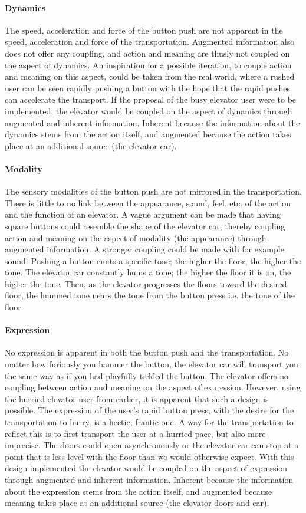\paragraph{Dynamics} The speed, acceleration and force of the button push are not apparent in the speed, acceleration and force of the transportation. Augmented information also does not offer any coupling, and action and meaning are thusly not coupled on the aspect of dynamics. An inspiration for a possible iteration, to couple action and meaning on this aspect, could be taken from the real world, where a rushed user can be seen rapidly pushing a button with the hope that the rapid pushes can accelerate the transport. If the proposal of the busy elevator user were to be implemented, the elevator would be coupled on the aspect of dynamics through augmented and inherent information. Inherent because the information about the dynamics stems from the action itself, and augmented because the action takes place at an additional source (the elevator car).
\paragraph{Modality} The sensory modalities of the button push are not mirrored in the transportation. There is little to no link between the appearance, sound, feel, etc. of the action and the function of an elevator. A vague argument can be made that having square buttons could resemble the shape of the elevator car, thereby coupling action and meaning on the aspect of modality (the appearance) through augmented information. A stronger coupling could be made with for example sound: Pushing a button emits a specific tone; the higher the floor, the higher the tone. The elevator car constantly hums a tone; the higher the floor it is on, the higher the tone. Then, as the elevator progresses the floors toward the desired floor, the hummed tone nears the tone from the button press i.e. the tone of the floor.
\paragraph{Expression} No expression is apparent in both the button push and the transportation. No matter how furiously you hammer the button, the elevator car will transport you the same way as if you had playfully tickled the button. The elevator offers no coupling between action and meaning on the aspect of expression. However, using the hurried elevator user from earlier, it is apparent that such a design is possible. The expression of the user's rapid button press, with the desire for the transportation to hurry, is a hectic, frantic one. A way for the transportation to reflect this is to first transport the user at a hurried pace, but also more imprecise. The doors could open asynchronously or the elevator car can stop at a point that is less level with the floor than we would otherwise expect. With this design implemented the elevator would be coupled on the aspect of expression through augmented and inherent information. Inherent because the information about the expression stems from the action itself, and augmented because meaning takes place at an additional source (the elevator doors and car).

